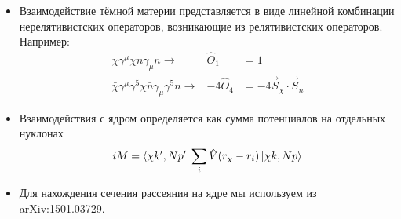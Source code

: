 \begin{itemize}
	\item Взаимодействие тёмной материи представляется в виде линейной комбинации нерелятивистских операторов, возникающие из релятивистских операторов. Например:
	\begin{eqnarray*}
		\bar{\chi}\gamma^{\mu}\chi \bar{n}\gamma_{\mu}n \rightarrow& \hat{O}_1 &= 1 \\
		\bar{\chi}\gamma^{\mu}\gamma^{5}\chi \bar{n}\gamma_{\mu}\gamma^{5}n \rightarrow& -4\hat{O}_4  &= -4 \vec{S}_{\chi}\cdot\vec{S}_{n}
	\end{eqnarray*}
	\item Взаимодействия с ядром определяется как сумма потенциалов на отдельных нуклонах
	\begin{equation*}
		iM = \bra{\chi k',N p'} \sum_i{\hat{V}(r_{\chi} - r_{i})} \ket{\chi k,N p \vphantom{'}}
	\end{equation*}
	\item Для нахождения сечения рассеяния на ядре мы используем из arXiv:1501.03729.
\end{itemize}